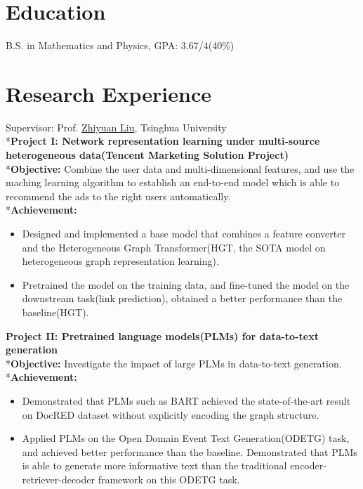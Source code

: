 \documentclass{resume}
\begin{document}



\section{Education}
B.S. in Mathematics and Physics, GPA: 3.67/4(40\%)


\section{Research Experience}
Supervisor: Prof. \href{http://nlp.csai.tsinghua.edu.cn/~lzy/}{Zhiyuan Liu}, Tsinghua University
\\*\textbf{Project I: Network representation learning under multi-source heterogeneous data(Tencent Marketing Solution Project)}
\\*\textbf{Objective:} Combine the user data and multi-dimensional features, and use the maching learning algorithm to establish an end-to-end model which is able to recommend the ads to the right users automatically. 
\\*\textbf{Achievement:}
\begin{itemize}
  \item Designed and implemented a base model that combines a feature converter and the Heterogeneous Graph Transformer(HGT, the SOTA model on heterogeneous graph representation learning). 
  \item Pretrained the model on the training data, and fine-tuned the model on the downstream task(link prediction), obtained a better performance than the baseline(HGT).
\end{itemize}

\textbf{Project II: Pretrained language models(PLMs) for data-to-text generation}
\\*\textbf{Objective:} Investigate the impact of large PLMs in data-to-text generation.
\\*\textbf{Achievement:}
\begin{itemize}
  \item Demonstrated that PLMs such as BART achieved the state-of-the-art result on DocRED dataset without explicitly encoding the graph structure.
  \item Applied PLMs on the Open Domain Event Text Generation(ODETG) task, and achieved better performance than the baseline. Demonstrated that PLMs is able to generate more informative text than the traditional encoder-retriever-decoder framework on this ODETG task.
\end{itemize}
\end{document}
